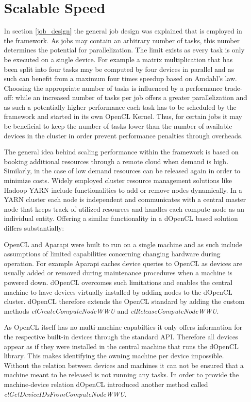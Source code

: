 \section{Scalable Speed}

In section \ref{job_design} the general job design was explained that is employed in the framework. As jobs may contain an arbitrary number of tasks, this number determines the potential for parallelization. The limit exists as every task is only be executed on a single device. For example a matrix multiplication that has been split into four tasks may be computed by four devices in parallel and as such can benefit from a maximum four times speedup based on Amdahl's law. Choosing the appropriate number of tasks is influenced by a performance trade-off: while an increased number of tasks per job offers a greater parallelization and as such a potentially higher performance each task has to be scheduled by the framework and started in its own OpenCL Kernel. Thus, for certain jobs it may be beneficial to keep the number of tasks lower than the number of available devices in the cluster in order prevent performance penalties through overheads.

The general idea behind scaling performance within the framework is based on booking additional resources through a remote cloud when demand is high. Similarly, in the case of low demand resources can be released again in order to minimize costs. Widely employed cluster resource management solutions like Hadoop YARN include functionalities to add or remove nodes dynamically. In a YARN cluster each node is independent and communicates with a central master node that keeps track of utilized resources and handles each compute node as an individual entity. Offering a similar functionality in a dOpenCL based solution differs substantially:

OpenCL and Aparapi were built to run on a single machine and as such include assumptions of limited capabilities concerning changing hardware during operation. For example Aparapi caches device queries to OpenCL as devices are usually added or removed during maintenance procedures when a machine is powered down. dOpenCL overcomes such limitations and enables the central machine to have devices virtually installed by adding nodes to the dOpenCL cluster. dOpenCL therefore extends the OpenCL standard by adding the custom methods \textit{clCreateComputeNodeWWU} and \textit{clReleaseComputeNodeWWU}. 

As OpenCL itself has no multi-machine capabilties it only offers information for the respective built-in devices through the standard API. Therefore all devices appear as if they were installed in the central machine that runs the dOpenCL library. This makes identifying the owning machine per device impossible. Without the relation between devices and machines it can not be ensured that a machine meant to be released is not running any tasks. In order to provide the machine-device relation dOpenCL introduced another method called \textit{clGetDeviceIDsFromComputeNodeWWU}.

